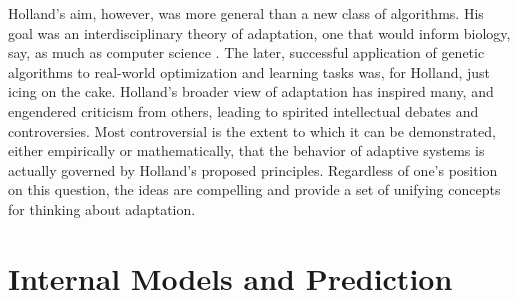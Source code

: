 \documentclass{sig-alternate}
\begin{document}
Holland's aim, however, was more general than a new class of algorithms.  His goal was an
interdisciplinary theory of adaptation, one that would inform biology, 
say, as much as computer science \cite{Christiansen1998}.  The later, successful application of
genetic algorithms to real-world optimization and learning tasks was,
for Holland, just icing on the cake.  
Holland's broader view of adaptation
has inspired many, and engendered criticism
from others, leading to spirited intellectual debates and
controversies.  Most controversial is the extent to which it can be
demonstrated, either empirically or mathematically, that the behavior
of adaptive systems is actually governed by Holland's proposed principles.
Regardless of one's position on this question, the ideas are compelling
and provide a set of unifying concepts for thinking about adaptation.







\section{Internal Models and Prediction}

\end{document}
